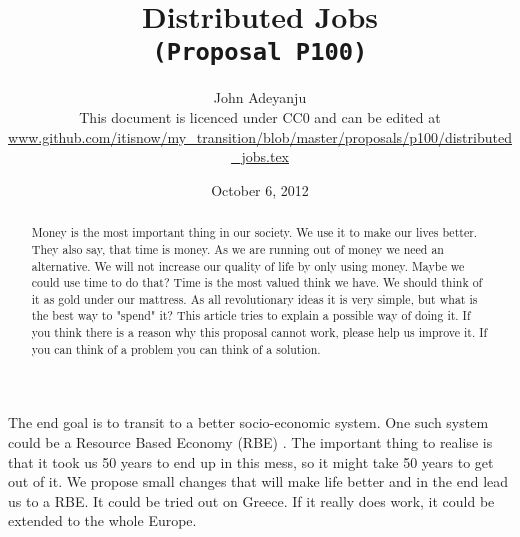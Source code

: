 \documentclass{article}
\begin{document}
\title{Distributed Jobs\\\tt{\small{(Proposal P100)}}\\\tt{\small{}}}%
\author{John Adeyanju\\\small{This document is licenced under CC0 and can be edited at}\\ \scriptsize{\url{www.github.com/itisnow/my_transition/blob/master/proposals/p100/distributed_jobs.tex}}}
\date{October 6, 2012}

\maketitle

\begin{abstract}
Money is the most important thing in our society.
We use it to make our lives better.
They also say, that time is money.
As we are running out of money we need an alternative.
We will not increase our quality of life by only using money.
Maybe we could use time to do that?
Time is the most valued think we have.
We should think of it as gold under our mattress.
As all revolutionary ideas it is very simple, but what is the best way to "spend" it? 
This article tries to explain a possible way of doing it.
If you think there is a reason why this proposal cannot work, please help us improve it.
If you can think of a problem you can think of a solution.
\end{abstract}

The end goal is to transit to a better socio-economic system.
One such system could be a Resource Based Economy (RBE) \cite{rbe}\cite{tzfs}.
The important thing to realise is that it took us 50 years to end up in this mess, so it might take 50 years to get out of it.
We propose small changes that will make life better and in the end lead us to a RBE.
It could be tried out on Greece.
If it really does work, it could be extended to the whole Europe.
\end{document}

